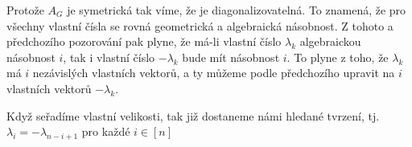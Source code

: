 \documentclass[../main.tex]{subfiles}
\begin{document}
    Protože $A_G$ je symetrická tak víme, že je diagonalizovatelná. To znamená, že pro všechny vlastní čísla se rovná geometrická a algebraická násobnost. Z tohoto a předchozího pozorování pak plyne, že má-li vlastní číslo
    $\lambda_k$ algebraickou násobnost $i$, tak i vlastní číslo $-\lambda_k$ bude mít násobnost $i$. To plyne z toho, že $\lambda_k$ má $i$ nezávislých vlastních vektorů, a  ty můžeme podle předchozího upravit na $i$ vlastních vektorů $-\lambda_k$.

    Když seřadíme vlastní velikosti, tak již dostaneme námi hledané tvrzení, tj.  $\lambda_i = - \lambda_{n-i+1}$ pro každé $i\in [n]$
\end{document}
